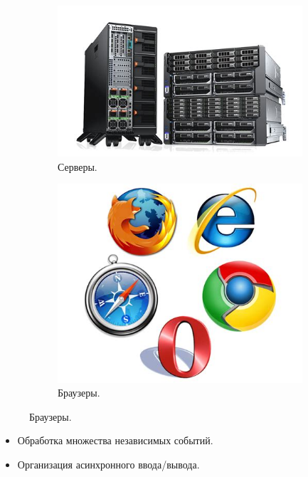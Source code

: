 \begin{frame}	
	\begin{figure}[h!]
		\centering
		\begin{subfigure}[b]{0.4\linewidth}
			\includegraphics[width=\linewidth]{images/server.jpg}
			\caption{Серверы.}
		\end{subfigure}
		\begin{subfigure}[b]{0.4\linewidth}
			\includegraphics[width=\linewidth]{images/browsers.jpg}
			\caption{Браузеры.}
		\end{subfigure}
		\hfill
	\end{figure}
	\par
	\begin{itemize}
		\item Обработка множества независимых событий.
		\item Организация асинхронного ввода/вывода.
	\end{itemize}
\end{frame}
	
